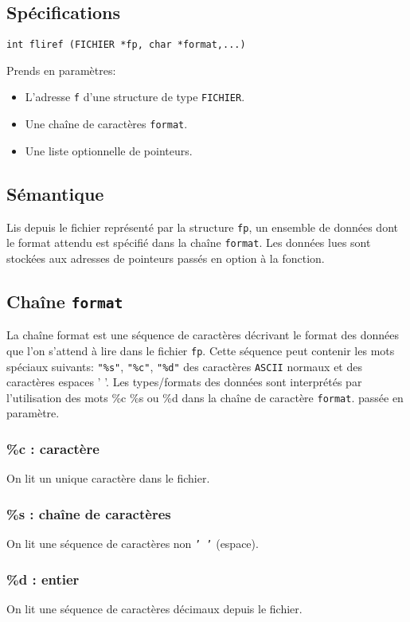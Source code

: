 \documentclass[11pt]{article}
\theoremstyle{definition}
\theoremstyle{definition}
\begin{document}
\subsection{Spécifications}
\texttt{int fliref (FICHIER *fp, char *format,...)}

Prends en paramètres:
\begin{itemize}
  \item L'adresse \texttt{f} d'une structure de type \texttt{FICHIER}.
  \item Une chaîne de caractères \texttt{format}.
  \item Une liste optionnelle de pointeurs.
\end{itemize}

\subsection{Sémantique}
Lis depuis le fichier représenté par la structure \texttt{fp}, un ensemble de données
dont le format attendu est spécifié dans la chaîne \texttt{format}. Les données lues
sont stockées aux adresses de pointeurs passés en option à la fonction.

\subsection{Chaîne \texttt{format}}
La chaîne format est une séquence de caractères décrivant le format des données
que l'on s'attend à lire dans le fichier \texttt{fp}. Cette séquence peut contenir
les mots spéciaux suivants: \texttt{"\%s"}, \texttt{"\%c"}, \texttt{"\%d"} des caractères \texttt{ASCII} normaux
et des caractères espaces ' '.
Les types/formats des données sont interprétés par
l'utilisation des mots \%c \%s ou \%d dans la chaîne de caractère \texttt{format}.
passée en paramètre.

\subsubsection{\%c : caractère}
On lit un unique caractère dans le fichier.
\subsubsection{\%s : chaîne de caractères}
On lit une séquence de caractères non \texttt{' '} (espace).
\subsubsection{\%d : entier}
On lit une séquence de caractères décimaux depuis le fichier.
\end{document}
